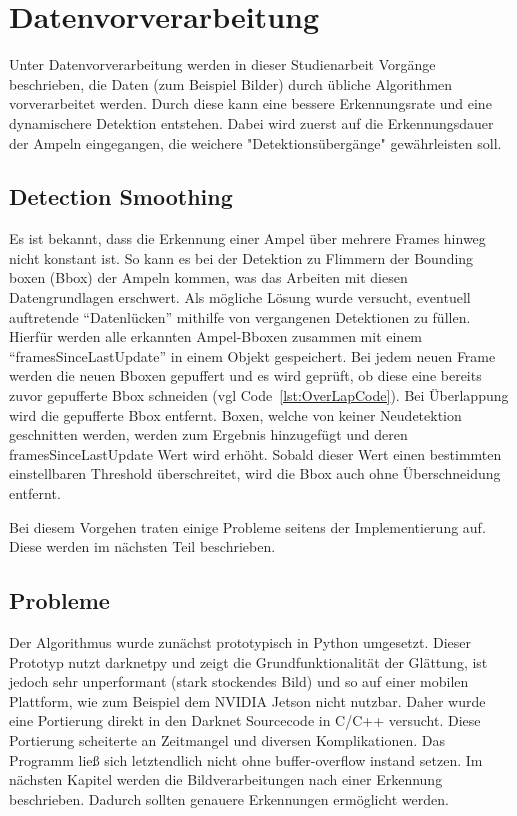 \documentclass[a4paper,oneside,12pt]{report}
\begin{document}
	\chapter{Datenvorverarbeitung}
	Unter Datenvorverarbeitung werden in dieser Studienarbeit Vorgänge beschrieben, die Daten (zum Beispiel Bilder) durch übliche Algorithmen vorverarbeitet werden. Durch diese kann eine bessere Erkennungsrate und eine dynamischere Detektion entstehen. Dabei wird zuerst auf die Erkennungsdauer der Ampeln eingegangen, die weichere "Detektionsübergänge" \space gewährleisten soll.
	\begin{onehalfspace}
		\section{Detection Smoothing}
		Es ist bekannt, dass die Erkennung einer Ampel über mehrere Frames hinweg nicht konstant ist. So kann es bei der Detektion zu Flimmern der Bounding boxen (Bbox) der Ampeln kommen, was das Arbeiten mit diesen Datengrundlagen erschwert.\newline
		Als mögliche Lösung wurde versucht, eventuell auftretende "`Datenlücken"' mithilfe von vergangenen Detektionen zu füllen. Hierfür werden alle erkannten Ampel-Bboxen zusammen mit einem "`framesSinceLastUpdate"' in einem Objekt gespeichert. Bei jedem neuen Frame werden die neuen Bboxen gepuffert und es wird geprüft, ob diese eine bereits zuvor gepufferte Bbox schneiden (vgl Code~\ref{lst:OverLapCode}). Bei Überlappung wird die gepufferte Bbox entfernt. Boxen, welche von keiner Neudetektion geschnitten werden, werden zum Ergebnis hinzugefügt und deren framesSinceLastUpdate Wert wird erhöht. Sobald dieser Wert einen bestimmten einstellbaren Threshold überschreitet, wird die Bbox auch ohne Überschneidung entfernt.
		
		Bei diesem Vorgehen traten einige Probleme seitens der Implementierung auf. Diese werden im nächsten Teil beschrieben.
		\section{Probleme}
		Der Algorithmus wurde zunächst prototypisch in Python umgesetzt. Dieser Prototyp nutzt darknetpy und zeigt die Grundfunktionalität der Glättung, ist jedoch sehr unperformant (stark stockendes Bild) und so auf einer mobilen Plattform, wie zum Beispiel dem NVIDIA Jetson nicht nutzbar. Daher wurde eine Portierung direkt in den Darknet Sourcecode in C/C++ versucht. Diese Portierung scheiterte an Zeitmangel und diversen Komplikationen. Das Programm ließ sich letztendlich nicht ohne buffer-overflow instand setzen. Im nächsten Kapitel werden die Bildverarbeitungen nach einer Erkennung beschrieben. Dadurch sollten genauere Erkennungen ermöglicht werden.
	\end{onehalfspace}
\end{document}
